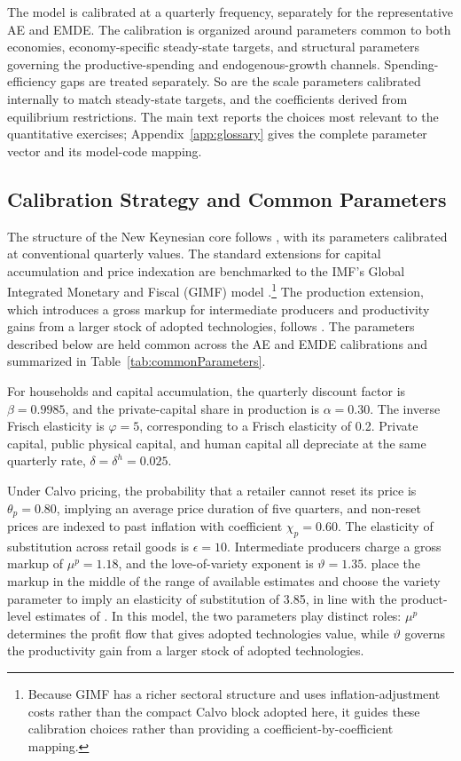 \documentclass[a4paper,11pt]{article}
\begin{document}
The model is calibrated at a quarterly frequency, separately for the representative AE and EMDE.
The calibration is organized around parameters common to both economies, economy-specific steady-state targets, and structural parameters governing the productive-spending and endogenous-growth channels.
Spending-efficiency gaps are treated separately.
So are the scale parameters calibrated internally to match steady-state targets, and the coefficients derived from equilibrium restrictions.
The main text reports the choices most relevant to the quantitative exercises; Appendix~\ref{app:glossary} gives the complete parameter vector and its model-code mapping.

\subsection{Calibration Strategy and Common Parameters}

The structure of the New Keynesian core follows \citet{gali2015}, with its parameters calibrated at conventional quarterly values.
The standard extensions for capital accumulation and price indexation are benchmarked to the IMF's Global Integrated Monetary and Fiscal (GIMF) model \citep{Andersonetal2013}.\footnote{Because GIMF has a richer sectoral structure and uses inflation-adjustment costs rather than the compact Calvo block adopted here, it guides these calibration choices rather than providing a coefficient-by-coefficient mapping.}
The production extension, which introduces a gross markup for intermediate producers and productivity gains from a larger stock of adopted technologies, follows \citet{Anzoateguietal2019}.
The parameters described below are held common across the AE and EMDE calibrations and summarized in Table~\ref{tab:commonParameters}.

For households and capital accumulation, the quarterly discount factor is $\beta=0.9985$, and the private-capital share in production is $\alpha=0.30$.
The inverse Frisch elasticity is $\varphi=5$, corresponding to a Frisch elasticity of 0.2.
Private capital, public physical capital, and human capital all depreciate at the same quarterly rate, $\delta=\delta^h=0.025$.

Under Calvo pricing, the probability that a retailer cannot reset its price is $\theta_p=0.80$, implying an average price duration of five quarters, and non-reset prices are indexed to past inflation with coefficient $\chi_p=0.60$.
The elasticity of substitution across retail goods is $\epsilon=10$.
Intermediate producers charge a gross markup of $\mu^p=1.18$, and the love-of-variety exponent is $\vartheta=1.35$.
\citet{Anzoateguietal2019} place the markup in the middle of the range of available estimates and choose the variety parameter to imply an elasticity of substitution of 3.85, in line with the product-level estimates of \citet{BrodaWeinstein2006}.
In this model, the two parameters play distinct roles: $\mu^p$ determines the profit flow that gives adopted technologies value, while $\vartheta$ governs the productivity gain from a larger stock of adopted technologies.
\end{document}
